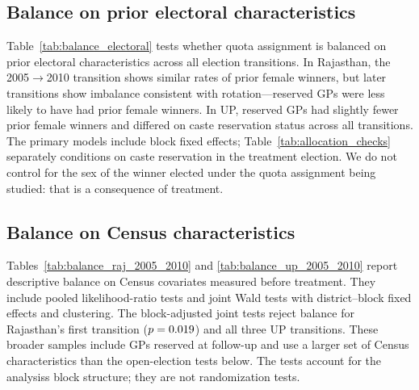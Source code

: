 
\FloatBarrier


\FloatBarrier

\subsection{Balance on prior electoral characteristics}

Table~\ref{tab:balance_electoral} tests whether quota assignment is balanced on prior electoral characteristics across all election transitions. In Rajasthan, the 2005$\rightarrow$2010 transition shows similar rates of prior female winners, but later transitions show imbalance consistent with rotation---reserved GPs were less likely to have had prior female winners. In UP, reserved GPs had slightly fewer prior female winners and differed on caste reservation status across all transitions. The primary models include block fixed effects; Table~\ref{tab:allocation_checks} separately conditions on caste reservation in the treatment election. We do not control for the sex of the winner elected under the quota assignment being studied: that is a consequence of treatment.

\begin{table}[!htbp]
    \centering
    \caption{Electoral Balance Tests for Quota Assignment Across Election Cycles}
    \label{tab:balance_electoral}
    
\end{table}
\FloatBarrier

\subsection{Balance on Census characteristics}

Tables~\ref{tab:balance_raj_2005_2010} and \ref{tab:balance_up_2005_2010} report descriptive balance on Census covariates measured before treatment. They include pooled likelihood-ratio tests and joint Wald tests with district--block fixed effects and clustering. The block-adjusted joint tests reject balance for Rajasthan's first transition ($p=0.019{}$) and all three UP transitions. These broader samples include GPs reserved at follow-up and use a larger set of Census characteristics than the open-election tests below. The tests account for the analysis\textquotesingle{}s block structure; they are not randomization tests.



\FloatBarrier

